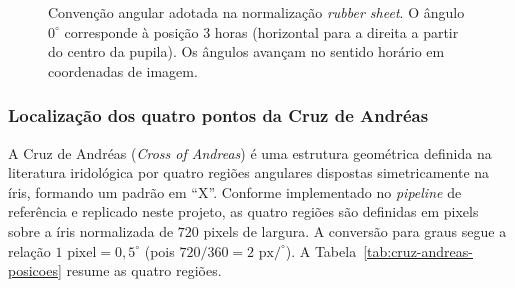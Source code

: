 \documentclass[11pt,a4paper]{article}
\begin{document}
\begin{figure}[H]
    \centering
    \caption{Convenção angular adotada na normalização \textit{rubber sheet}. O ângulo \(0^\circ\) corresponde à posição 3 horas (horizontal para a direita a partir do centro da pupila). Os ângulos avançam no sentido horário em coordenadas de imagem.}
    \label{fig:angulo-zero}
\end{figure}

\subsubsection{Localização dos quatro pontos da Cruz de Andréas}

A Cruz de Andréas (\textit{Cross of Andreas}) é uma estrutura geométrica definida na literatura iridológica por quatro regiões angulares dispostas simetricamente na íris, formando um padrão em ``X''. Conforme implementado no \textit{pipeline} de referência \citep{SamantAgarwal2018CMPB} e replicado neste projeto, as quatro regiões são definidas em pixels sobre a íris normalizada de \(720\) pixels de largura. A conversão para graus segue a relação \(1\text{ pixel} = 0{,}5^\circ\) (pois \(720 / 360 = 2\text{ px/}^\circ\)). A Tabela~\ref{tab:cruz-andreas-posicoes} resume as quatro regiões.
\end{document}
